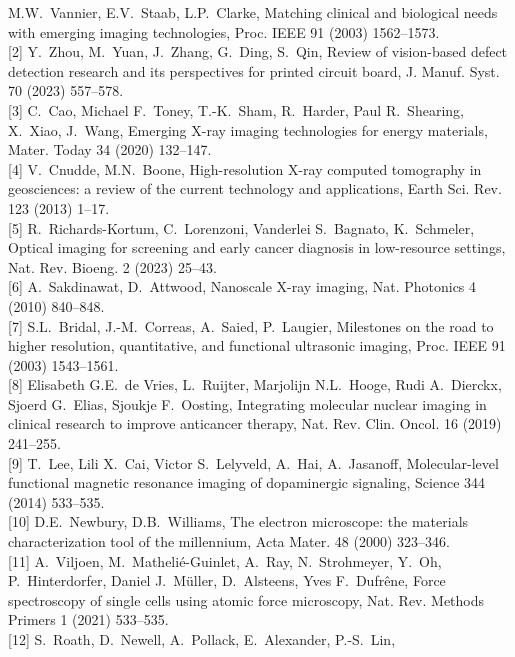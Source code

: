 \documentclass[11pt]{article}
\begin{document}
\begin{footnotesize}
\noindent
[1] M.W.~Vannier, E.V.~Staab, L.P.~Clarke, Matching clinical and
biological needs with emerging imaging technologies, Proc. IEEE 91
(2003) 1562--1573.\\[2pt]
[2] Y.~Zhou, M.~Yuan, J.~Zhang, G.~Ding, S.~Qin, Review of
vision-based defect detection research and its perspectives for
printed circuit board, J. Manuf. Syst. 70 (2023) 557--578.\\[2pt]
[3] C.~Cao, Michael F.~Toney, T.-K.~Sham, R.~Harder, Paul R.~Shearing,
X.~Xiao, J.~Wang, Emerging X-ray imaging technologies for energy
materials, Mater. Today 34 (2020) 132--147.\\[2pt]
[4] V.~Cnudde, M.N.~Boone, High-resolution X-ray computed
tomography in geosciences: a review of the current technology and
applications, Earth Sci. Rev. 123 (2013) 1--17.\\[2pt]
[5] R.~Richards-Kortum, C.~Lorenzoni, Vanderlei S.~Bagnato,
K.~Schmeler, Optical imaging for screening and early cancer
diagnosis in low-resource settings, Nat. Rev. Bioeng. 2 (2023)
25--43.\\[2pt]
[6] A.~Sakdinawat, D.~Attwood, Nanoscale X-ray imaging, Nat.
Photonics 4 (2010) 840--848.\\[2pt]
[7] S.L.~Bridal, J.-M.~Correas, A.~Saied, P.~Laugier, Milestones
on the road to higher resolution, quantitative, and functional
ultrasonic imaging, Proc. IEEE 91 (2003) 1543--1561.\\[2pt]
[8] Elisabeth G.E.~de Vries, L.~Ruijter, Marjolijn N.L.~Hooge,
Rudi A.~Dierckx, Sjoerd G.~Elias, Sjoukje F.~Oosting, Integrating
molecular nuclear imaging in clinical research to improve
anticancer therapy, Nat. Rev. Clin. Oncol. 16 (2019) 241--255.\\[2pt]
[9] T.~Lee, Lili X.~Cai, Victor S.~Lelyveld, A.~Hai, A.~Jasanoff,
Molecular-level functional magnetic resonance imaging of
dopaminergic signaling, Science 344 (2014) 533--535.\\[2pt]
[10] D.E.~Newbury, D.B.~Williams, The electron microscope: the
materials characterization tool of the millennium, Acta Mater. 48
(2000) 323--346.\\[2pt]
[11] A.~Viljoen, M.~Mathelié-Guinlet, A.~Ray, N.~Strohmeyer,
Y.~Oh, P.~Hinterdorfer, Daniel J.~Müller, D.~Alsteens, Yves F.~Dufrêne,
Force spectroscopy of single cells using atomic force microscopy,
Nat. Rev. Methods Primers 1 (2021) 533--535.\\[2pt]
[12] S.~Roath, D.~Newell, A.~Pollack, E.~Alexander, P.-S.~Lin,

\end{footnotesize}
\end{document}
